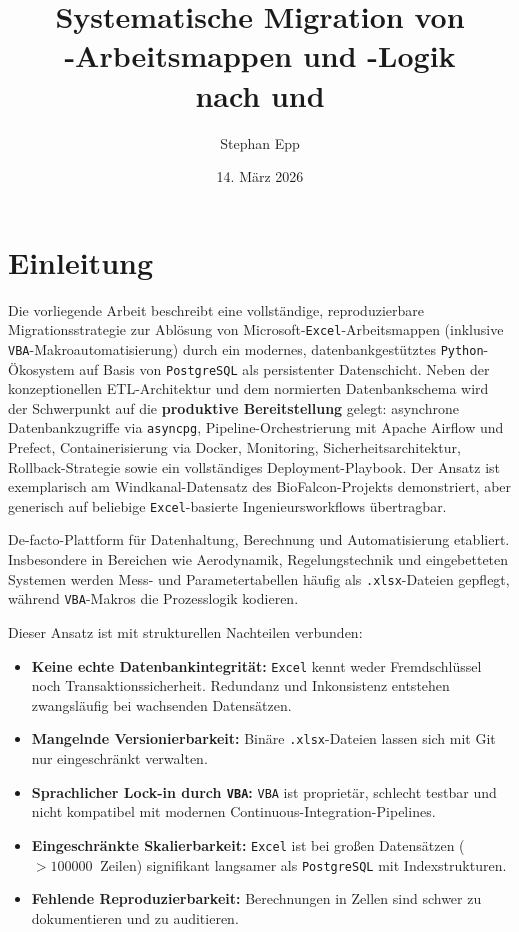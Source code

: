 \documentclass[12pt,a4paper]{report}
\title{Systematische Migration von\\[0.3em]
	\excel-Arbeitsmappen und \vba-Logik\\[0.3em]
	nach \pg{} und \py}
\author{Stephan Epp}
\date{14. März 2026}
\theoremstyle{definition}
\theoremstyle{remark}
\newcommand{\excel}{\texttt{Excel}}
\newcommand{\vba}{\texttt{VBA}}
\newcommand{\pg}{\texttt{PostgreSQL}}
\newcommand{\py}{\texttt{Python}}
\newcommand{\code}[1]{\texttt{#1}}
\begin{document}
\maketitle
\tableofcontents
\newpage

\chapter{Einleitung}
Die vorliegende Arbeit beschreibt eine vollständige, reproduzierbare
Migrationsstrategie zur Ablösung von Microsoft-\excel-Arbeitsmappen
(inklusive \vba-Makroautomatisierung) durch ein modernes,
datenbankgestütztes \py-Ökosystem auf Basis von \pg{} als persistenter
Datenschicht. Neben der konzeptionellen ETL-Architektur und dem
normierten Datenbankschema wird der Schwerpunkt auf die
\textbf{produktive Bereitstellung} gelegt: asynchrone Datenbankzugriffe
via \code{asyncpg}, Pipeline-Orchestrierung mit Apache Airflow und Prefect,
Containerisierung via Docker, Monitoring, Sicherheitsarchitektur,
Rollback-Strategie sowie ein vollständiges Deployment-Playbook.
Der Ansatz ist exemplarisch am Windkanal-Datensatz des BioFalcon-Projekts
demonstriert, aber generisch auf beliebige \excel-basierte Ingenieursworkflows
übertragbar.

De-facto-Plattform für Datenhaltung, Berechnung und Automatisierung
etabliert. Insbesondere in Bereichen wie Aerodynamik, Regelungstechnik
und eingebetteten Systemen werden Mess- und Parametertabellen häufig als
\code{.xlsx}-Dateien gepflegt, während \vba-Makros die Prozesslogik kodieren.

Dieser Ansatz ist mit strukturellen Nachteilen verbunden:

\begin{itemize}[leftmargin=1.5em]
  \item \textbf{Keine echte Datenbankintegrität:} \excel{} kennt weder
        Fremdschlüssel noch Transaktionssicherheit. Redundanz und
        Inkonsistenz entstehen zwangsläufig bei wachsenden Datensätzen.
  \item \textbf{Mangelnde Versionierbarkeit:} Binäre \code{.xlsx}-Dateien
        lassen sich mit Git nur eingeschränkt verwalten.
  \item \textbf{Sprachlicher Lock-in durch \vba:} \vba{} ist proprietär,
        schlecht testbar und nicht kompatibel mit modernen
        Continuous-Integration-Pipelines.
  \item \textbf{Eingeschränkte Skalierbarkeit:} \excel{} ist bei gro\ss{}en
        Datensätzen ($> \SI{100000}{}$ Zeilen) signifikant langsamer als
        \pg{} mit Indexstrukturen.
  \item \textbf{Fehlende Reproduzierbarkeit:} Berechnungen in Zellen sind
        schwer zu dokumentieren und zu auditieren.
\end{itemize}
\end{document}
